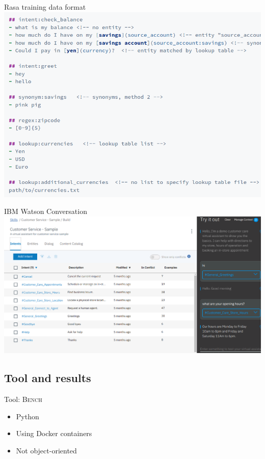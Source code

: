 \documentclass[pdf]{beamer}
\begin{document}
    \begin{frame}{Rasa training data format}
        \includegraphics[width=\textwidth]{figures/rasa_data_format.png}
    \end{frame}

    \begin{frame}{IBM Watson Conversation}
        \hspace*{-1cm}
        \includegraphics[height=0.9\textheight]{figures/watson.png}
    \end{frame}

    \subsection{Tool and results}
    \begin{frame}{Tool: \textsc{Bench}}
        \begin{itemize}
            \item Python
            \item Using Docker containers
            \item Not object-oriented\footnotemark
        \end{itemize}
      \end{frame}
      
\end{document}

